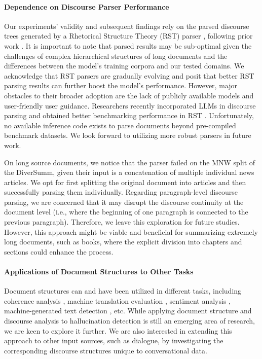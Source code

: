 \paragraph{Dependence on Discourse Parser Performance} Our experiments' validity and subsequent findings rely on the parsed discourse trees generated by a Rhetorical Structure Theory (RST) parser \cite{liu-etal-2021-dmrst}, following prior work \cite{adams-etal-2023-generating,pu-etal-2023-incorporating, kim2024threads}. It is important to note that parsed results may be sub-optimal given the challenges of complex hierarchical structures of long documents and the differences between the model's training corpora and our tested domains. We acknowledge that RST parsers are gradually evolving and posit that better RST parsing results can further boost the model's performance. However, major obstacles to their broader adoption are the lack of publicly available models and user-friendly user guidance. Researchers recently incorporated LLMs in discourse parsing and obtained better benchmarking performance in RST \cite{maekawa-etal-2024-obtain}. Unfortunately, no available inference code exists to parse documents beyond pre-compiled benchmark datasets. We look forward to utilizing more robust parsers in future work.

On long source documents, we notice that the parser failed on the MNW split of the DiverSumm, given their input is a concatenation of multiple individual news articles. We opt for first splitting the original document into articles and then successfully parsing them individually. Regarding paragraph-level discourse parsing, we are concerned that it may disrupt the discourse continuity at the document level (i.e., where the beginning of one paragraph is connected to the previous paragraph). Therefore, we leave this exploration for future studies. However, this approach might be viable and beneficial for summarizing extremely long documents, such as books, where the explicit division into chapters and sections could enhance the process.

\paragraph{Applications of Document Structures to Other Tasks}

Document structures can and have been utilized in different tasks, including coherence analysis \cite{liu-etal-2024-unlocking}, machine translation evaluation \cite{joty-etal-2017-discourse}, sentiment analysis \cite{KRAUS201965}, machine-generated text detection \cite{kim2024threads}, etc. While applying document structure and discourse analysis to hallucination detection is still an emerging area of research, we are keen to explore it further. We are also interested in extending this approach to other input sources, such as dialogue, by investigating the corresponding discourse structures unique to conversational data.

